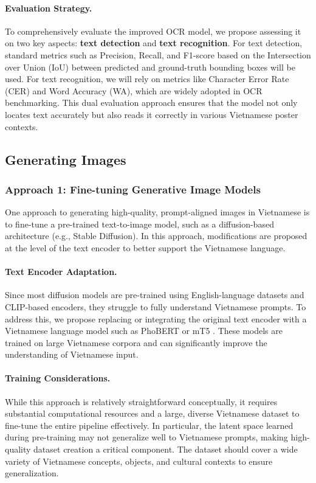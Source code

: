 \documentclass[conference]{IEEEtran}
\begin{document}
\paragraph{Evaluation Strategy.} 
To comprehensively evaluate the improved OCR model, we propose assessing it on two key aspects: \textbf{text detection} and \textbf{text recognition}. For text detection, standard metrics such as Precision, Recall, and F1-score based on the Intersection over Union (IoU) between predicted and ground-truth bounding boxes will be used. For text recognition, we will rely on metrics like Character Error Rate (CER) and Word Accuracy (WA), which are widely adopted in OCR benchmarking. This dual evaluation approach ensures that the model not only locates text accurately but also reads it correctly in various Vietnamese poster contexts.

\subsection{Generating Images}

\subsubsection{Approach 1: Fine-tuning Generative Image Models}

One approach to generating high-quality, prompt-aligned images in Vietnamese is to fine-tune a pre-trained text-to-image model, such as a diffusion-based architecture (e.g., Stable Diffusion). In this approach, modifications are proposed at the level of the text encoder to better support the Vietnamese language.

\paragraph{Text Encoder Adaptation.} Since most diffusion models are pre-trained using English-language datasets and CLIP-based encoders, they struggle to fully understand Vietnamese prompts. To address this, we propose replacing or integrating the original text encoder with a Vietnamese language model such as PhoBERT \cite{nguyen2020phobertpretrainedlanguagemodels} or mT5 \cite{xue2021mt5massivelymultilingualpretrained}. These models are trained on large Vietnamese corpora and can significantly improve the understanding of Vietnamese input.

\paragraph{Training Considerations.} While this approach is relatively straightforward conceptually, it requires substantial computational resources and a large, diverse Vietnamese dataset to fine-tune the entire pipeline effectively. In particular, the latent space learned during pre-training may not generalize well to Vietnamese prompts, making high-quality dataset creation a critical component. The dataset should cover a wide variety of Vietnamese concepts, objects, and cultural contexts to ensure generalization.
\end{document}

